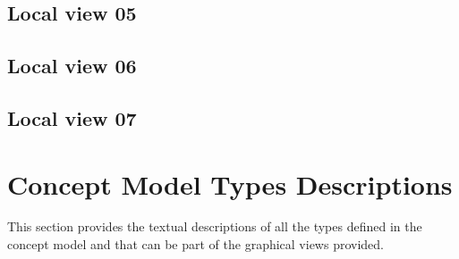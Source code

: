 \subsection{Local view 05}
\label{sec:lu.uni.lassy.excalibur.group09.spec-CM-view-local-PrimaryTypes-Datatypes-05}

\subsection{Local view 06}
\label{sec:lu.uni.lassy.excalibur.group09.spec-CM-view-local-PrimaryTypes-Datatypes-06}

\subsection{Local view 07}
\label{sec:lu.uni.lassy.excalibur.group09.spec-CM-view-local-PrimaryTypes-Datatypes-07}










\section{Concept Model Types Descriptions}
This section provides the textual descriptions of all the types defined in the concept model and that can be part of the graphical views provided.












